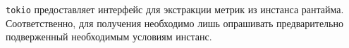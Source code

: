 







\verb|tokio| предоставляет интерфейс для экстракции метрик из инстанса рантайма. Соответственно, для получения необходимо лишь опрашивать предварительно подверженный необходимым условиям инстанс.

